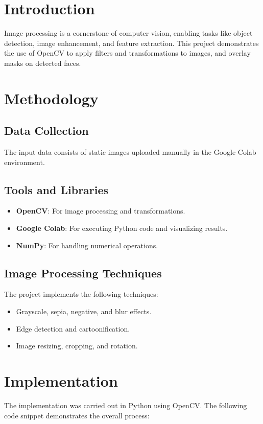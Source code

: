 \documentclass{report}
\begin{document}
\section{Introduction}
Image processing is a cornerstone of computer vision, enabling tasks like object detection, image enhancement, and feature extraction. This project demonstrates the use of OpenCV to apply filters and transformations to images, and overlay masks on detected faces.

\section{Methodology}
\subsection{Data Collection}
The input data consists of static images uploaded manually in the Google Colab environment. 

\subsection{Tools and Libraries}
\begin{itemize}
    \item \textbf{OpenCV}: For image processing and transformations.
    \item \textbf{Google Colab}: For executing Python code and visualizing results.
    \item \textbf{NumPy}: For handling numerical operations.
\end{itemize}

\subsection{Image Processing Techniques}
The project implements the following techniques:
\begin{itemize}
    \item Grayscale, sepia, negative, and blur effects.
    \item Edge detection and cartoonification.
    \item Image resizing, cropping, and rotation.
\end{itemize}

\section{Implementation}
The implementation was carried out in Python using OpenCV. The following code snippet demonstrates the overall process:
\end{document}
